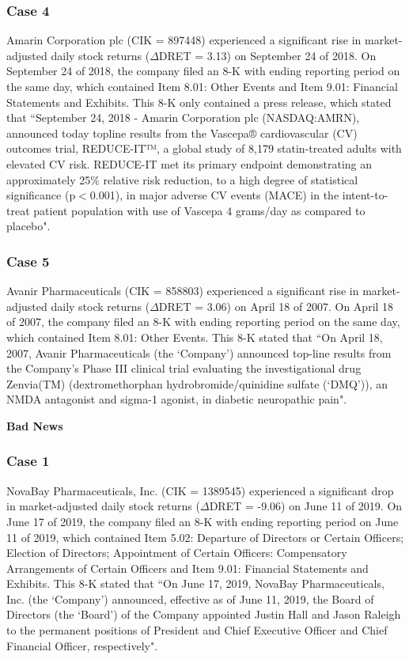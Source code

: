 \subsubsection*{Case 4}
Amarin Corporation plc (CIK = 897448) experienced a significant rise in market-adjusted daily stock returns ($\Delta$DRET = 3.13) on September 24 of 2018. On September 24 of 2018, the company filed an 8-K with ending reporting period on the same day, which contained Item 8.01: Other Events and Item 9.01: Financial Statements and Exhibits. This 8-K only contained a press release, which stated that ``September 24, 2018 - Amarin Corporation plc (NASDAQ:AMRN), announced today topline results from the Vascepa® cardiovascular (CV) outcomes trial, REDUCE-IT™, a global study of 8,179 statin-treated adults with elevated CV risk. REDUCE-IT met its primary endpoint demonstrating an approximately 25\% relative risk reduction, to a high degree of statistical significance (p$<$0.001), in major adverse CV events (MACE) in the intent-to-treat patient population with use of Vascepa 4 grams/day as compared to placebo".
\subsubsection*{Case 5}
Avanir Pharmaceuticals (CIK = 858803) experienced a significant rise in market-adjusted daily stock returns ($\Delta$DRET = 3.06) on April 18 of 2007. On April 18 of 2007, the company filed an 8-K with ending reporting period on the same day, which contained Item 8.01: Other Events. This 8-K stated that ``On April 18, 2007, Avanir Pharmaceuticals (the `Company') announced top-line results from the Company's Phase III clinical trial evaluating the investigational drug Zenvia(TM) (dextromethorphan hydrobromide/quinidine sulfate (`DMQ')), an NMDA antagonist and sigma-1 agonist, in diabetic neuropathic pain".
\begin{center}
	\textbf{Bad News}
\end{center}
\subsubsection*{Case 1}
NovaBay Pharmaceuticals, Inc. (CIK = 1389545) experienced a significant drop in market-adjusted daily stock returns ($\Delta$DRET = -9.06) on June 11 of 2019. On June 17 of 2019, the company filed an 8-K with ending reporting period on June 11 of 2019, which contained Item 5.02: Departure of Directors or Certain Officers; Election of Directors; Appointment of Certain Officers: Compensatory Arrangements of Certain Officers and Item 9.01: Financial Statements and Exhibits. This 8-K stated that ``On June 17, 2019, NovaBay Pharmaceuticals, Inc. (the `Company') announced, effective as of June 11, 2019, the Board of Directors (the `Board') of the Company appointed Justin Hall and Jason Raleigh to the permanent positions of President and Chief Executive Officer and Chief Financial Officer, respectively".
